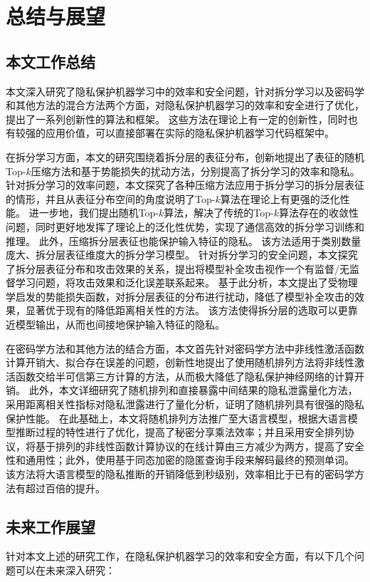 \chapter{总结与展望}
\section{本文工作总结}
本文深入研究了隐私保护机器学习中的效率和安全问题，针对拆分学习以及密码学和其他方法的混合方法两个方面，对隐私保护机器学习的效率和安全进行了优化，提出了一系列创新性的算法和框架。
%
这些方法在理论上有一定的创新性，同时也有较强的应用价值，可以直接部署在实际的隐私保护机器学习代码框架中。
%

在拆分学习方面，本文的研究围绕着拆分层的表征分布，创新地提出了表征的随机Top-$k$压缩方法和基于势能损失的扰动方法，分别提高了拆分学习的效率和隐私。
%
针对拆分学习的效率问题，本文探究了各种压缩方法应用于拆分学习的拆分层表征的情形，并且从表征分布空间的角度说明了Top-$k$算法在理论上有更强的泛化性能。
进一步地，我们提出随机Top-$k$算法，解决了传统的Top-$k$算法存在的收敛性问题，同时更好地发挥了理论上的泛化性优势，实现了通信高效的拆分学习训练和推理。
此外，压缩拆分层表征也能保护输入特征的隐私。
%
该方法适用于类别数量庞大、拆分层表征维度大的拆分学习模型。
%
针对拆分学习的安全问题，本文探究了拆分层表征分布和攻击效果的关系，提出将模型补全攻击视作一个有监督/无监督学习问题，将攻击效果和泛化误差联系起来。
基于此分析，本文提出了受物理学启发的势能损失函数，对拆分层表征的分布进行扰动，降低了模型补全攻击的效果，显著优于现有的降低距离相关性的方法。
该方法使得拆分层的选取可以更靠近模型输出，从而也间接地保护输入特征的隐私。

在密码学方法和其他方法的结合方面，本文首先针对密码学方法中非线性激活函数计算开销大、拟合存在误差的问题，创新性地提出了使用随机排列方法将非线性激活函数交给半可信第三方计算的方法，从而极大降低了隐私保护神经网络的计算开销。
此外，本文详细研究了随机排列和直接暴露中间结果的隐私泄露量化方法，采用距离相关性指标对隐私泄露进行了量化分析，证明了随机排列具有很强的隐私保护性能。
在此基础上，本文将随机排列方法推广至大语言模型，根据大语言模型推断过程的特性进行了优化，提高了秘密分享乘法效率；并且采用安全排列协议，将基于排列的非线性函数计算协议的在线计算由三方减少为两方，提高了安全性和通用性；此外，使用基于同态加密的隐匿查询手段来解码最终的预测单词。
%
该方法将大语言模型的隐私推断的开销降低到秒级别，效率相比于已有的密码学方法有超过百倍的提升。


\section{未来工作展望}
针对本文上述的研究工作，在隐私保护机器学习的效率和安全方面，有以下几个问题可以在未来深入研究：
%

